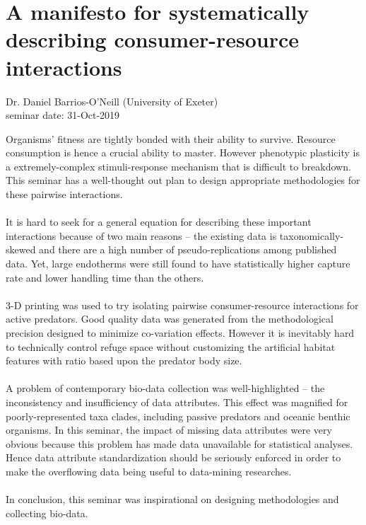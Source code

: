 \documentclass{article}
\begin{document}
    \section{A manifesto for systematically describing consumer-resource interactions}
    \begin{flushright}
        \large{Dr. Daniel Barrios-O'Neill (University of Exeter)}\\
        seminar date: 31-Oct-2019
    \end{flushright}
    Organisms' fitness are tightly bonded with their ability to survive.  Resource consumption is hence a crucial ability to master.  However phenotypic plasticity is a extremely-complex stimuli-response mechanism that is difficult to breakdown.  This seminar has a well-thought out plan to design appropriate methodologies for these pairwise interactions.\\\\
    It is hard to seek for a general equation for describing these important interactions because of two main reasons -- the existing data is taxonomically-skewed and there are a high number of pseudo-replications among published data.  Yet, large endotherms were still found to have statistically higher capture rate and lower handling time than the others.\\\\
    3-D printing was used to try isolating pairwise consumer-resource interactions for active predators.  Good quality data was generated from the methodological precision designed to minimize co-variation effects.  However it is inevitably hard to technically control refuge space without customizing the artificial habitat features with ratio based upon the predator body size.\\\\
    A problem of contemporary bio-data collection was well-highlighted -- the inconsistency and insufficiency of data attributes.  This effect was magnified for poorly-represented taxa clades, including passive predators and oceanic benthic organisms.  In this seminar, the impact of missing data attributes were very obvious because this problem has made data unavailable for statistical analyses.  Hence data attribute standardization should be seriously enforced in order to make the overflowing data being useful to data-mining researches.\\\\
    In conclusion, this seminar was inspirational on designing methodologies and collecting bio-data.
    \clearpage
    
\end{document}
